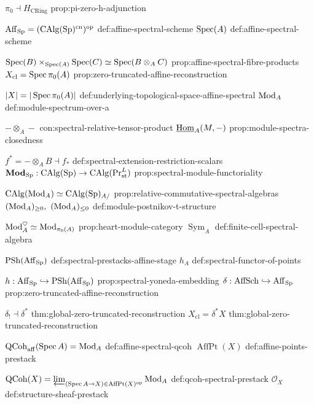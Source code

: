 \begin{longtable}
\NotationSingle
{\(\pi_0\dashv H_{\mathrm{CRing}}\)}
{prop:pi-zero-h-adjunction}



\NotationPair
{\(\operatorname{Aff}_{\operatorname{Sp}}=(\operatorname{CAlg}(\operatorname{Sp})^{\mathrm{cn}})^{\mathrm{op}}\)}
{def:affine-spectral-scheme}
{\(\operatorname{Spec}(A)\)}
{def:affine-spectral-scheme}

\NotationPair
{\(\operatorname{Spec}(B)\times_{\operatorname{Spec}(A)}\operatorname{Spec}(C)\simeq\operatorname{Spec}(B\otimes_A C)\)}
{prop:affine-spectral-fibre-products}
{\(X_{\mathrm{cl}}=\operatorname{Spec}\pi_0(A)\)}
{prop:zero-truncated-affine-reconstruction}

\NotationPair
{\(|X|=|\operatorname{Spec}\pi_0(A)|\)}
{def:underlying-topological-space-affine-spectral}
{\(\operatorname{Mod}_A\)}
{def:module-spectrum-over-a}

\NotationPair
{\(-\otimes_A-\)}
{con:spectral-relative-tensor-product}
{\(\underline{\operatorname{Hom}}_A(M,-)\)}
{prop:module-spectra-closedness}

\NotationPair
{\(f^*=-\otimes_A B\dashv f_*\)}
{def:spectral-extension-restriction-scalars}
{\(\mathbf{Mod}_{\operatorname{Sp}}:\operatorname{CAlg}(\operatorname{Sp})\to\operatorname{CAlg}(\operatorname{Pr}^L_{\mathrm{st}})\)}
{prop:spectral-module-functoriality}

\NotationPair
{\(\operatorname{CAlg}(\operatorname{Mod}_A)\simeq\operatorname{CAlg}(\operatorname{Sp})_{A/}\)}
{prop:relative-commutative-spectral-algebras}
{\((\operatorname{Mod}_A)_{\geq0},\ (\operatorname{Mod}_A)_{\leq0}\)}
{def:module-postnikov-t-structure}

\NotationPair
{\(\operatorname{Mod}_A^\heartsuit\simeq\operatorname{Mod}_{\pi_0(A)}\)}
{prop:heart-module-category}
{\(\operatorname{Sym}_A\)}
{def:finite-cell-spectral-algebra}



\NotationPair
{\(\operatorname{PSh}(\operatorname{Aff}_{\operatorname{Sp}})\)}
{def:spectral-prestacks-affine-stage}
{\(h_A\)}
{def:spectral-functor-of-points}

\NotationPair
{\(h:\operatorname{Aff}_{\operatorname{Sp}}\hookrightarrow\operatorname{PSh}(\operatorname{Aff}_{\operatorname{Sp}})\)}
{prop:spectral-yoneda-embedding}
{\(\delta:\operatorname{AffSch}\hookrightarrow\operatorname{Aff}_{\operatorname{Sp}}\)}
{prop:zero-truncated-affine-reconstruction}

\NotationPair
{\(\delta_!\dashv\delta^*\)}
{thm:global-zero-truncated-reconstruction}
{\(X_{\mathrm{cl}}=\delta^*X\)}
{thm:global-zero-truncated-reconstruction}

\NotationPair
{\(\operatorname{QCoh}_{\mathrm{aff}}(\operatorname{Spec} A)=\operatorname{Mod}_A\)}
{def:affine-spectral-qcoh}
{\(\operatorname{AffPt}(X)\)}
{def:affine-points-prestack}

\NotationPair
{\(\operatorname{QCoh}(X)=\varprojlim_{(\operatorname{Spec} A\to X)\in\operatorname{AffPt}(X)^{\mathrm{op}}}\operatorname{Mod}_A\)}
{def:qcoh-spectral-prestack}
{\(\mathcal O_X\)}
{def:structure-sheaf-prestack}


\end{longtable}
